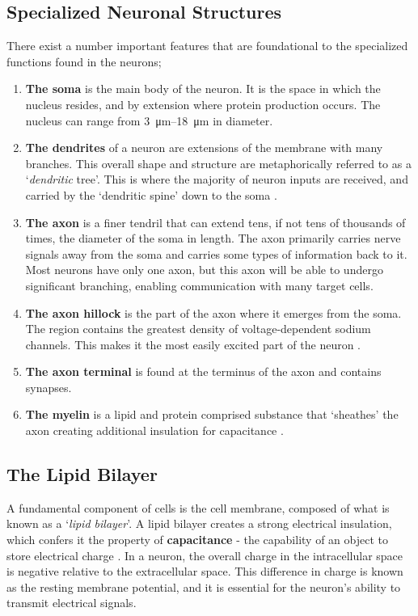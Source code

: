 \documentclass[../../Orator]{subfiles}
\begin{document}
\subsection{Specialized Neuronal Structures}
There exist a number important features that are foundational to the specialized functions found in the neurons;
\begin{enumerate}
    \item \textbf{The soma} is the main body of the neuron. It is the space in which the nucleus resides, and by extension where protein production occurs. The nucleus can range from \qtyrange{3}{18}{\um} in diameter.
    \item \textbf{The dendrites} of a neuron are extensions of the membrane with many branches. This overall shape and structure are metaphorically referred to as a `\textit{dendritic} tree'\footnotemark. This is where the majority of neuron inputs are received, and carried by the `dendritic spine' down to the soma \cite{}. 
    \item \textbf{The axon} is a finer tendril that can extend tens, if not tens of thousands of times, the diameter of the soma in length. The axon primarily carries nerve signals away from the soma and carries some types of information back to it. Most neurons have only one axon, but this axon will be able to undergo significant branching, enabling communication with many target cells. 
    \item \textbf{The axon hillock} is the part of the axon where it emerges from the soma. The region contains the greatest density of voltage-dependent sodium channels. This makes it the most easily excited part of the neuron \cite{}. 
    \item \textbf{The axon terminal} is found at the terminus of the axon and contains synapses. 
    \item \textbf{The myelin} is a lipid and protein comprised substance that `sheathes' the axon creating additional insulation for capacitance \cite{}.
\end{enumerate}


\subsection{The Lipid Bilayer} 
A fundamental component of cells is the cell membrane, composed of what is known as a `\textit{lipid bilayer}'\footnotemark. A lipid bilayer creates a strong electrical insulation, 
which confers it the property of  \textbf{capacitance} - the capability of an object to store electrical charge \cite{}.  
In a neuron, the overall charge in the intracellular space is negative relative to the extracellular space. 
This difference in charge is known as the resting membrane potential, and it is essential for the neuron's ability to transmit electrical signals. 
\end{document}
